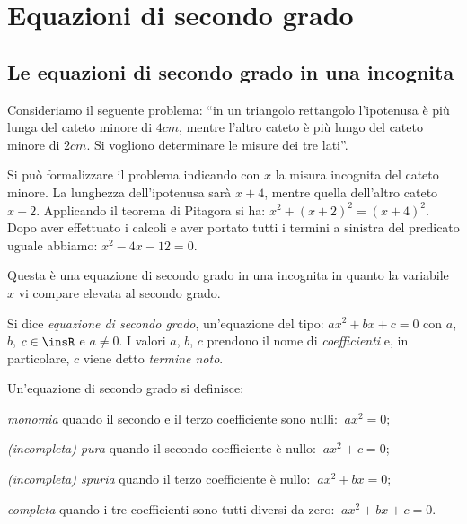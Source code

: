 \chapter{Equazioni di secondo grado}
\section{Le equazioni di secondo grado in una incognita}

Consideriamo il seguente problema: ``in un triangolo rettangolo l'ipotenusa è più lunga del cateto minore di $4\unit{cm}$, mentre l'altro cateto è più lungo del cateto minore di $2\unit{cm}$. Si vogliono determinare le misure dei tre lati''.

Si può formalizzare il problema indicando con $x$ la misura incognita del cateto minore. La lunghezza dell'ipotenusa sarà $x + 4$, mentre quella dell'altro cateto $x + 2$. Applicando il teorema di Pitagora si ha: $x ^{2 } + ( x + 2 ) ^{2 } = ( x + 4 ) ^{2 }$. Dopo aver effettuato i calcoli e aver portato tutti i termini a sinistra del predicato uguale abbiamo: $x ^{2}-4x-12=0$.
\begin{center}

\end{center}

Questa è una equazione di secondo grado in una incognita in quanto la variabile $x$ vi compare elevata al secondo grado.
\begin{definizione}
Si dice \emph{equazione di secondo grado}, un'equazione del tipo: $a x ^{2} + b x + c = 0$ con $a$, $b$, $c \in \insR$ e $a \neq 0$. I valori $a$, $b$, $c$ prendono il nome di \emph{coefficienti} e, in particolare, $c$ viene detto \emph{termine noto}.
\end{definizione}

Un'equazione di secondo grado si definisce:
\begin{description*}
 \item \emph{monomia} quando il secondo e il terzo coefficiente sono nulli: $\:a x ^{2}=0$;
 \item \emph{(incompleta) pura} quando il secondo coefficiente è nullo: $\:a x ^{2} + c = 0$;
 \item \emph{(incompleta) spuria} quando il terzo coefficiente è nullo: $\:a x ^{2} + b x = 0$;
 \item \emph{completa} quando i tre coefficienti sono tutti diversi da zero: $\:a x ^{2} + b x + c = 0$.
\end{description*}

